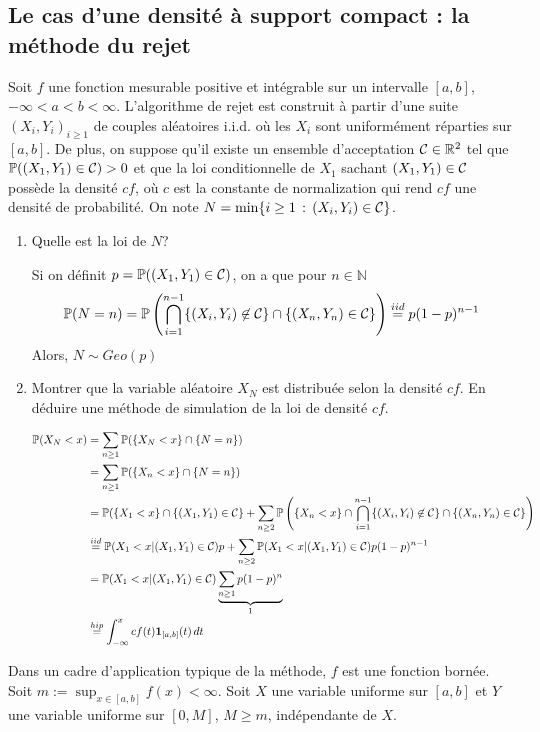 \documentclass[a4paper]{article}
\begin{document}
\subsection{Le cas d'une densit\'e \`a support compact : la m\'ethode du rejet}

Soit $f$ une fonction mesurable positive et int\'egrable sur un intervalle $[a,b]$, $-\infty<a<b<\infty$. L'algorithme de rejet est construit \`a partir d'une suite $(X_i,Y_i)_{i\geq1}$ de couples al\'eatoires i.i.d. o\`u les $X_i$ sont uniform\'ement r\'eparties sur $[a,b]$. De plus, on suppose qu'il existe un ensemble d'acceptation ${\cal C}\in \mathbb{R}^2$ tel que $\mathbb{P}((X_1,Y_1)\in {\cal C})>0$ et que la loi conditionnelle de $X_1$ sachant $(X_1,Y_1)\in{\cal C}$ poss\`ede la densit\'e $cf$, o\`u $c$ est la constante de normalization qui rend $cf$ une densit\'e de probabilit\'e. On note $N = \min\{i\geq1\,:\,(X_i,Y_i)\in{\cal C}\}$.

\begin{enumerate}
\item Quelle est la loi de $N$?

Si on d\'efinit $p = \mathbb{P}((X_1,Y_1)\in{\cal C})$, on a que pour $n\in\mathbb{N}$
$$\mathbb{P}(N=n) = \mathbb{P}\left(\bigcap\limits_{i=1}^{n-1}\{(X_i,Y_i)\not\in{\cal C}\}\cap \{(X_n,Y_n)\in{\cal C}\}\right) \stackrel{iid}{=} p(1-p)^{n-1}$$
Alors, $N\sim Geo(p)$


\item Montrer que la variable al\'eatoire $X_N$ est distribu\'ee selon la densit\'e $cf$. En d\'eduire une m\'ethode de simulation de la loi de densit\'e $cf$.

\begin{align*}
\mathbb{P}(X_N<x) &= \sum\limits_{n\geq1}\mathbb{P}(\{X_N<x\} \cap \{N=n\})\\&= \sum\limits_{n\geq1}\mathbb{P}(\{X_n<x\} \cap \{N=n\})\\&= \mathbb{P}(\{X_1<x\}\cap\{(X_1,Y_1)\in{\cal C}\} + \sum\limits_{n\geq2}\mathbb{P}\left(\{X_n<x\} \cap \bigcap\limits_{i=1}^{n-1}\{(X_i,Y_i)\not\in{\cal C}\}\cap\{(X_n,Y_n)\in{\cal C}\}\right)\\&\stackrel{iid}{=}\mathbb{P}(X_1<x|(X_1,Y_1)\in{\cal C})p + \sum\limits_{n\geq2}\mathbb{P}(X_1<x|(X_1,Y_1)\in{\cal C})p(1-p)^{n-1}\\&= \mathbb{P}(X_1<x|(X_1,Y_1)\in{\cal C})\underbrace{\sum\limits_{n\geq1}p(1-p)^n}_{1}\\&\stackrel{hip}{=}\int_{-\infty}^x cf(t)\mathbf{1}_{[a,b]}(t)\,dt
\end{align*}



\end{enumerate}
Dans un cadre d'application typique de la m\'ethode, $f$ est une fonction born\'ee. Soit $m:=\sup_{x\in[a,b]}f(x)<\infty$. Soit $X$ une variable uniforme sur $[a,b]$ et $Y$ une variable uniforme sur $[0,M]$, $M\geq m$, ind\'ependante de $X$.
\end{document}
